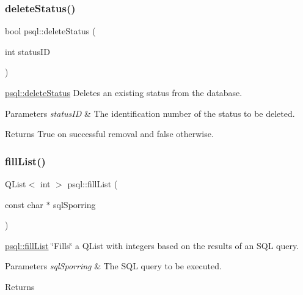 \subsubsection{\texorpdfstring{delete\+Status()}{deleteStatus()}}
{\footnotesize\ttfamily bool psql\+::delete\+Status (\begin{DoxyParamCaption}\item[{int}]{status\+ID }\end{DoxyParamCaption})}



\hyperlink{classpsql_a26fc592cfb9f484e1bee62af527f2b95}{psql\+::delete\+Status} Deletes an existing status from the database. 


\begin{DoxyParams}{Parameters}
{\em status\+ID} & The identification number of the status to be deleted. \\
\hline
\end{DoxyParams}
\begin{DoxyReturn}{Returns}
True on successful removal and false otherwise. 
\end{DoxyReturn}
\mbox{\label{classpsql_a9a3082a159c962dfcd84e23930f5619b}} 
\subsubsection{\texorpdfstring{fill\+List()}{fillList()}}
{\footnotesize\ttfamily Q\+List$<$ int $>$ psql\+::fill\+List (\begin{DoxyParamCaption}\item[{const char $\ast$}]{sql\+Sporring }\end{DoxyParamCaption})}



\hyperlink{classpsql_a9a3082a159c962dfcd84e23930f5619b}{psql\+::fill\+List} \char`\"{}\+Fills\char`\"{} a Q\+List with integers based on the results of an S\+QL query. 


\begin{DoxyParams}{Parameters}
{\em sql\+Sporring} & The S\+QL query to be executed. \\
\hline
\end{DoxyParams}
\begin{DoxyReturn}{Returns}

\end{DoxyReturn}
\mbox{\label{classpsql_af3462a12dc106e0ca8df4fa8fcf28436}} 
